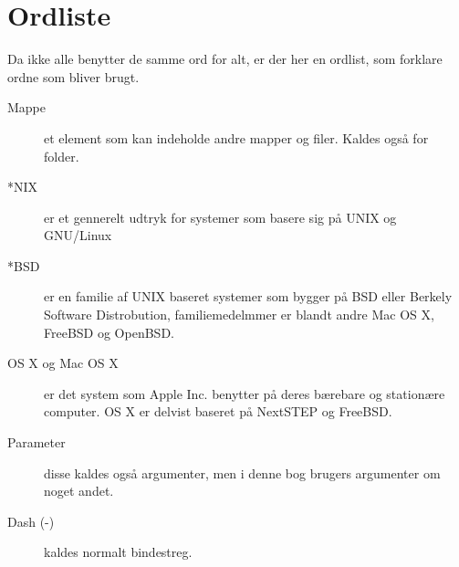 \chapter{Ordliste}
Da ikke alle benytter de samme ord for alt, er der her en ordlist, som forklare ordne som bliver brugt.
\begin{description}
   \item[Mappe] et element som kan indeholde andre mapper og filer. Kaldes også for folder. 
   \item[*NIX] er et gennerelt udtryk for systemer som basere sig på UNIX og GNU/Linux 
   \item[*BSD] er en familie af UNIX baseret systemer som bygger på BSD eller Berkely 
     Software Distrobution, familiemedelmmer er blandt andre Mac OS X, FreeBSD og OpenBSD.
   \item[OS X og Mac OS X] er det system som Apple Inc. benytter på deres bærebare 
     og stationære computer. OS X er delvist baseret på NextSTEP og FreeBSD.
   \item[Parameter] disse kaldes også argumenter, men i denne bog brugers argumenter om noget andet.     
   \item[Dash (-)] kaldes normalt bindestreg. 
\end{description}
